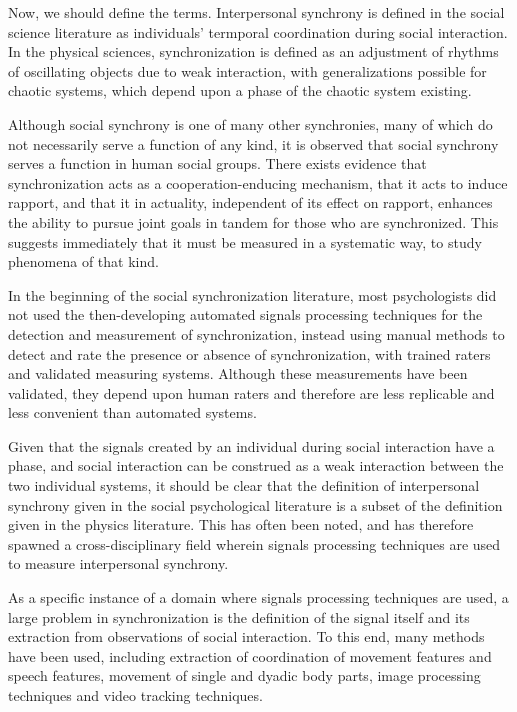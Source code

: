 \documentclass[12pt]{article}
\begin{document}
Now, we should define the terms. Interpersonal synchrony is defined in the social science literature as individuals' termporal coordination during social interaction. In the physical sciences, synchronization is defined as an adjustment of rhythms of oscillating objects due to weak interaction, with generalizations possible for chaotic systems, which depend upon a phase of the chaotic system existing. %

Although social synchrony is one of many other synchronies, many of which do not necessarily serve a function of any kind, it is observed that social synchrony serves a function in human social groups. There exists evidence that synchronization acts as a cooperation-enducing mechanism, that it acts to induce rapport, and that it in actuality, independent of its effect on rapport, enhances the ability to pursue joint goals in tandem for those who are synchronized. This suggests immediately that it must be measured in a systematic way, to study phenomena of that kind. %

In the beginning of the social synchronization literature, most psychologists did not used the then-developing automated signals processing techniques for the detection and measurement of synchronization, instead using manual methods to detect and rate the presence or absence of synchronization, with trained raters and validated measuring systems. Although these measurements have been validated, they depend upon human raters and therefore are less replicable and less convenient than automated systems. %

Given that the signals created by an individual during social interaction have a phase, and social interaction can be construed as a weak interaction between the two individual systems, it should be clear that the definition of interpersonal synchrony given in the social psychological literature is a subset of the definition given in the physics literature. This has often been noted, and has therefore spawned a cross-disciplinary field wherein signals processing techniques are used to measure interpersonal synchrony. %

As a specific instance of a domain where signals processing techniques are used, a large problem in synchronization is the definition of the signal itself and its extraction from observations of social interaction. To this end, many methods have been used, including extraction of coordination of movement features and speech features, movement of single and dyadic body parts, image processing techniques and video tracking techniques. %
\end{document}
